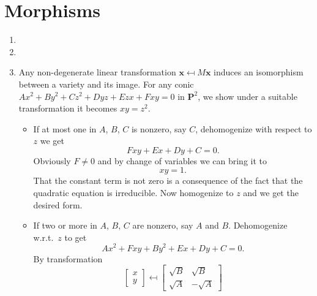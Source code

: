 \documentclass{note}
\newcommand{\Proj}[1]{\mathbf{P}^{#1}}
\begin{document}
\section{Morphisms}


\Ex
\begin{enumerate}
  \item
  \item
  \item Any non-degenerate linear transformation $\mathbf{x} \mapsfrom M\mathbf{x}$
        induces an isomorphism between a variety and its image. For any conic $Ax^2 +
          By^2 + Cz^2 + Dyz + Ezx + Fxy = 0$ in $\Proj{2}$, we show under a suitable
        transformation it becomes $xy = z^2$.
        \begin{itemize}
          \item If at most one in $A$, $B$, $C$ is nonzero, say $C$, dehomogenize with respect
                to $z$ we get
                \begin{equation*}
                  Fxy + Ex + Dy + C = 0.
                \end{equation*}
                Obviously $F \ne 0$ and by change of variables we can bring it to
                \begin{equation*}
                  xy = 1.
                \end{equation*}
                That the constant term is not zero is a consequence of the fact that the
                quadratic equation is irreducible. Now homogenize to $z$ and we get the desired
                form.
          \item If two or more in $A$, $B$, $C$ are nonzero, say $A$ and $B$. Dehomogenize
                w.r.t.~$z$ to get
                \begin{equation*}
                  Ax^2 + Fxy + By^2 + Ex + Dy + C = 0.
                \end{equation*}
                By transformation
                \begin{equation*}
                  \begin{bmatrix}
                    x \\ y
                  \end{bmatrix}
                  \mapsfrom
                  \begin{bmatrix}
                    \sqrt{B} & \sqrt{B}  \\
                    \sqrt{A} & -\sqrt{A}


\end{bmatrix}
\end{equation*}
\end{itemize}
\end{enumerate}
\end{document}
